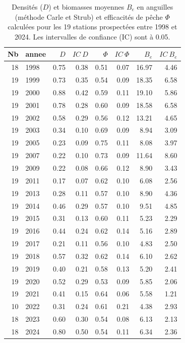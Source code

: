 \begin{table}[htbp]
\centering
\caption[Densités et biomasses.]{Densités ($D$) et biomasses moyennes $B_e$ en anguilles (méthode Carle et Strub) et efficacités de pêche $\Phi$ calculées pour
								les 19 stations prospectées entre 1998 et 2024. Les intervalles de confiance (IC) sont
								à 0.05.} 
\label{tableau2_dens_eff_annee}
\begin{tabular}{rlrrrrrr}
  \hline
Nb & annee & $D$ & $IC~D$ & $\Phi$ & $IC~\Phi$ & $B_e$ & $IC~B_e$ \\ 
  \hline
 18 & 1998 & 0.75 & 0.38 & 0.51 & 0.07 & 16.97 & 4.46 \\ 
   19 & 1999 & 0.73 & 0.35 & 0.54 & 0.09 & 18.35 & 6.58 \\ 
   19 & 2000 & 0.88 & 0.42 & 0.59 & 0.11 & 19.10 & 5.86 \\ 
   19 & 2001 & 0.78 & 0.28 & 0.60 & 0.09 & 18.58 & 6.58 \\ 
   19 & 2002 & 0.58 & 0.29 & 0.56 & 0.12 & 13.21 & 4.65 \\ 
   19 & 2003 & 0.34 & 0.10 & 0.69 & 0.09 & 8.94 & 3.09 \\ 
   19 & 2005 & 0.23 & 0.09 & 0.75 & 0.11 & 8.08 & 3.97 \\ 
   19 & 2007 & 0.22 & 0.10 & 0.73 & 0.09 & 11.64 & 8.60 \\ 
   19 & 2009 & 0.22 & 0.08 & 0.66 & 0.12 & 8.90 & 3.43 \\ 
   19 & 2011 & 0.17 & 0.07 & 0.62 & 0.10 & 6.08 & 2.56 \\ 
   19 & 2013 & 0.28 & 0.11 & 0.57 & 0.10 & 8.90 & 4.36 \\ 
   19 & 2014 & 0.46 & 0.29 & 0.57 & 0.10 & 9.51 & 4.85 \\ 
   19 & 2015 & 0.31 & 0.13 & 0.60 & 0.11 & 5.23 & 2.29 \\ 
   19 & 2016 & 0.44 & 0.24 & 0.62 & 0.14 & 5.16 & 2.89 \\ 
   19 & 2017 & 0.21 & 0.11 & 0.56 & 0.10 & 4.83 & 2.50 \\ 
   19 & 2018 & 0.57 & 0.32 & 0.62 & 0.14 & 6.10 & 2.62 \\ 
   19 & 2019 & 0.40 & 0.21 & 0.58 & 0.13 & 5.20 & 2.41 \\ 
   19 & 2020 & 0.52 & 0.29 & 0.53 & 0.09 & 5.85 & 2.06 \\ 
   19 & 2021 & 0.41 & 0.15 & 0.64 & 0.06 & 5.58 & 1.21 \\ 
   10 & 2022 & 0.31 & 0.24 & 0.61 & 0.21 & 4.38 & 2.93 \\ 
   18 & 2023 & 0.60 & 0.30 & 0.54 & 0.08 & 6.13 & 2.13 \\ 
   18 & 2024 & 0.80 & 0.50 & 0.54 & 0.11 & 6.34 & 2.36 \\ 
   \hline
\end{tabular}
\end{table}
